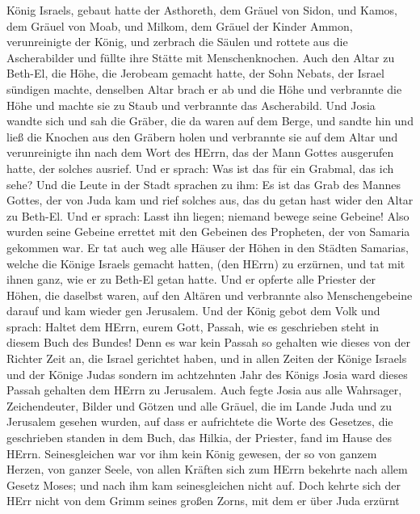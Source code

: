 König Israels, gebaut hatte der Asthoreth, dem Gräuel von Sidon, und
Kamos, dem Gräuel von Moab, und Milkom, dem Gräuel der Kinder Ammon,
verunreinigte der König,  und zerbrach die Säulen und
rottete aus die Ascherabilder und füllte ihre Stätte mit
Menschenknochen.  Auch den Altar zu Beth-El, die Höhe, die
Jerobeam gemacht hatte, der Sohn Nebats, der Israel sündigen machte,
denselben Altar brach er ab und die Höhe und verbrannte die Höhe und
machte sie zu Staub und verbrannte das Ascherabild.  Und
Josia wandte sich und sah die Gräber, die da waren auf dem Berge, und
sandte hin und ließ die Knochen aus den Gräbern holen und verbrannte sie
auf dem Altar und verunreinigte ihn nach dem Wort des HErrn, das der
Mann Gottes ausgerufen hatte, der solches ausrief.  Und er
sprach: Was ist das für ein Grabmal, das ich sehe? Und die Leute in der
Stadt sprachen zu ihm: Es ist das Grab des Mannes Gottes, der von Juda
kam und rief solches aus, das du getan hast wider den Altar zu Beth-El.
 Und er sprach: Lasst ihn liegen; niemand bewege seine
Gebeine! Also wurden seine Gebeine errettet mit den Gebeinen des
Propheten, der von Samaria gekommen war.  Er tat auch weg
alle Häuser der Höhen in den Städten Samarias, welche die Könige Israels
gemacht hatten, (den HErrn) zu erzürnen, und tat mit ihnen ganz, wie er
zu Beth-El getan hatte.  Und er opferte alle Priester der
Höhen, die daselbst waren, auf den Altären und verbrannte also
Menschengebeine darauf und kam wieder gen Jerusalem.  Und
der König gebot dem Volk und sprach: Haltet dem HErrn, eurem Gott,
Passah, wie es geschrieben steht in diesem Buch des Bundes!
 Denn es war kein Passah so gehalten wie dieses von der
Richter Zeit an, die Israel gerichtet haben, und in allen Zeiten der
Könige Israels und der Könige Judas  sondern im achtzehnten
Jahr des Königs Josia ward dieses Passah gehalten dem HErrn zu
Jerusalem.  Auch fegte Josia aus alle Wahrsager,
Zeichendeuter, Bilder und Götzen und alle Gräuel, die im Lande Juda und
zu Jerusalem gesehen wurden, auf dass er aufrichtete die Worte des
Gesetzes, die geschrieben standen in dem Buch, das Hilkia, der Priester,
fand im Hause des HErrn.  Seinesgleichen war vor ihm kein
König gewesen, der so von ganzem Herzen, von ganzer Seele, von allen
Kräften sich zum HErrn bekehrte nach allem Gesetz Moses; und nach ihm
kam seinesgleichen nicht auf.  Doch kehrte sich der HErr
nicht von dem Grimm seines großen Zorns, mit dem er über Juda erzürnt
